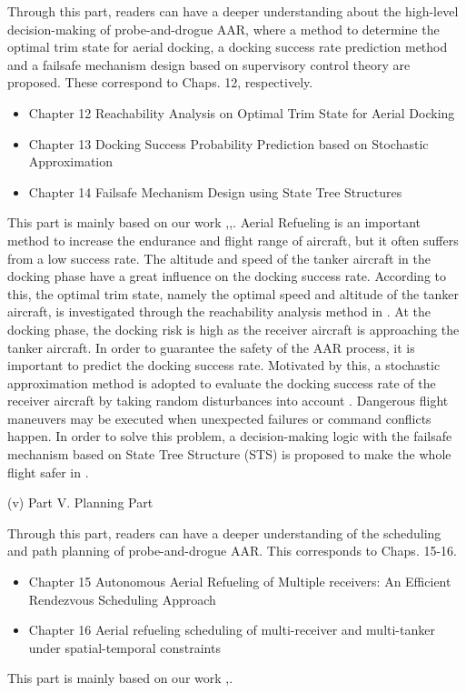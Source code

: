 Through this part, readers can have a deeper understanding about the
high-level decision-making of probe-and-drogue AAR, where a method
to determine the optimal trim state for aerial docking, a docking
success rate prediction method and a failsafe mechanism design based
on supervisory control theory are proposed. These correspond to Chaps.
12, respectively. 
\begin{itemize}
\item Chapter 12 Reachability Analysis on Optimal Trim State for Aerial Docking
\item Chapter 13 Docking Success Probability Prediction based on Stochastic Approximation
\item Chapter 14 Failsafe Mechanism Design using State Tree Structures
\end{itemize}
This part is mainly based on our work \cite{liu2021reachability},\cite{2021A},\cite{dong2019failsafe}. Aerial Refueling is an important method to increase
the endurance and flight range of aircraft, but it often suffers from
a low success rate. The altitude and speed of the tanker aircraft
in the docking phase have a great influence on the docking success
rate. According to this, the optimal trim state, namely the optimal
speed and altitude of the tanker aircraft, is investigated through
the reachability analysis method in \cite{liu2021reachability}. At the docking phase,
the docking risk is high as the receiver aircraft is approaching the
tanker aircraft. In order to guarantee the safety of the AAR process,
it is important to predict the docking success rate. Motivated by
this, a stochastic approximation method is adopted to evaluate the
docking success rate of the receiver aircraft by taking random disturbances
into account \cite{2021A}. Dangerous flight maneuvers may be executed when
unexpected failures or command conflicts happen. In order to solve
this problem, a decision-making logic with the failsafe mechanism
based on State Tree Structure (STS) is proposed to make the whole
flight safer in \cite{dong2019failsafe}.

(v) Part V. Planning Part 

Through this part, readers can have a deeper understanding of the scheduling and path planning of probe-and-drogue AAR. This corresponds to Chaps. 15-16.
\begin{itemize}
	\item Chapter 15 Autonomous Aerial Refueling of Multiple receivers:
	An Efficient Rendezvous Scheduling Approach
	\item Chapter 16 Aerial refueling scheduling of multi-receiver and multi-tanker under spatial-temporal constraints
\end{itemize} 
This part is mainly based on our work \cite{hao2021autonomous},\cite{huang2024aerial}.


